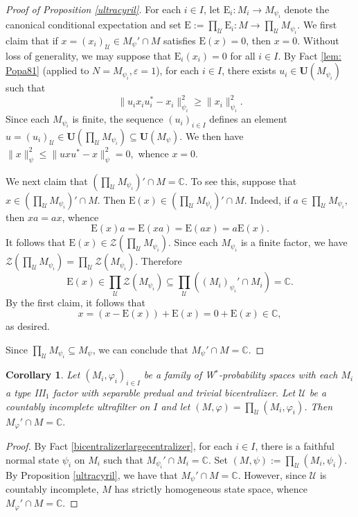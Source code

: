 \documentclass[12pt]{amsart}
\newtheorem{cor}[thm]{Corollary}
\theoremstyle{definition}
\newcommand{\C}{\mathbb{C}}
\newcommand{\E}{\mathrm{E}}
\def\bb{\mathbb}
\def\bb{\mathbb}
\def\cal{\mathcal}
\def\u{\mathsf 1}
\newcommand\cU{{\cal U}}
\def \u{\mathcal U}
\begin{document}
\begin{proof}[Proof of Proposition \ref{ultracyril}]
For each $i\in I$, let $\E_i:M_i\to M_{\psi_i}$ denote the canonical conditional expectation and set $\E:=\prod_\cU \E_i:M\to \prod_\cU M_{\psi_i}$.  We first claim that if $x=(x_i)_\cU\in M_\psi'\cap M$ satisfies $\E(x)=0$, then $x=0$.  Without loss of generality, we may suppose that $\E_i(x_i)=0$ for all $i\in I$. By Fact \ref{lem: Popa81} (applied to $N=M_{\psi_i}, \varepsilon=1$), for each $i\in I$, there exists $u_i\in \mathbf{U}(M_{\psi_i})$ such that 
\[\|u_ix_iu_i^*-x_i\|_{\psi_i}^2\geq \|x_i\|_{\psi_i}^2.\]
Since each $M_{\psi_i}$ is finite, the sequence $(u_i)_{i\in I}$ defines an element $u=(u_i)_{\cU}\in \mathbf{U}(\prod_\cU M_{\psi_i})\subseteq \mathbf{U}(M_\psi)$.  We then have 
$\|x\|_{\psi}^2\leq \|uxu^*-x\|_{\psi}^2=0,$
whence $x=0$. 

We next claim that $(\prod_\cU M_{\psi_i})'\cap M=\mathbb C$.  To see this, suppose that $x\in (\prod_\cU M_{\psi_i})'\cap M$. Then $\E(x)\in (\prod_\cU M_{\psi_i})'\cap M$.  Indeed, if $a\in \prod_\cU M_{\psi_i}$, then $xa=ax$, whence
$$\E(x)a=\E(xa)=\E(ax)=a\E(x).$$
It follows that $\E(x)\in \mathcal{Z}(\prod_{\cU}M_{\psi_i})$.  Since each $M_{\psi_i}$ is a finite factor, we have $\mathcal{Z}(\prod_{\cU}M_{\psi_i})=\prod_{\cU}\mathcal{Z}(M_{\psi_i})$. Therefore 
\[\E(x)\in \prod_{\cU}\mathcal{Z}(M_{\psi_i})\subseteq \prod_{\cU}((M_i)_{\psi_i}'\cap M_i)=\mathbb{C}.\]
By the first claim, it follows that 
$$x=(x-\E(x))+\E(x)=0+\E(x)\in \mathbb{C},$$
as desired.

Since $\prod_{\cU}M_{\psi_i}\subseteq M_{\psi}$, we can conclude that 
$M_{\psi}'\cap M=\mathbb{C}$. 
\end{proof}

\begin{cor}\label{ultracyrilcorollary}
    Let \((M_i,\varphi_i)_{i\in I}\) be a family of W\(^*\)-probability spaces with each \(M_i\) a type III\(_1\) factor with separable predual and trivial bicentralizer. Let \(\cU\) be a countably incomplete ultrafilter on \(I\) and let \((M,\varphi)=\prod_{\cU}(M_i,\varphi_i)\). Then \(M_{\varphi}'\cap M=\C.\)  
\end{cor}

\begin{proof}
By Fact \ref{bicentralizerlargecentralizer}, for each $i\in I$, there is a faithful normal state $\psi_i$ on $M_i$ such that $M_{\psi_i}'\cap M_i=\bb C$.  Set $(M,\psi):=\prod_\u (M_i,\psi_i)$.  By Proposition \ref{ultracyril}, we have that $M_\psi'\cap M=\bb C$.  However, since $\u$ is countably incomplete, $M$ has strictly homogeneous state space, whence $M_\varphi'\cap M=\bb C$.
\end{proof}
\end{document}

